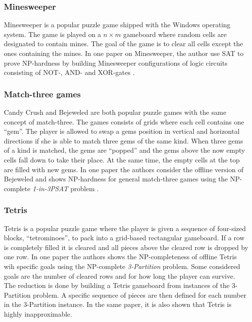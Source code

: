 \subsubsection{Minesweeper}
Minesweeper is a popular puzzle game shipped with the Windows operating system. The game is played on a $n \times m$ gameboard where random cells are designated to contain mines. The goal of the game is to clear all cells except the ones containing the mines. In one paper on Minesweeper, the author use SAT to prove NP-hardness by building Minesweeper configurations of logic circuits consisting of NOT-, AND- and XOR-gates \cite{minesweeper}.

\subsubsection{Match-three games}

Candy Crush and Bejeweled are both popular puzzle games with the same concept of match-three. The games consists of grids where each cell contains one ``gem''. The player is allowed to swap a gems position in vertical and horizontal directions if she is able to match three gems of the same kind. When three gems of a kind is matched, the gems are ``popped'' and the gems above the now empty cells fall down to take their place. At the same time, the empty cells at the top are filled with new gems. In one paper the authors consider the offline version of Bejeweled and shows NP-hardness for general match-three games using the NP-complete \textit{1-in-3PSAT} problem \cite{candy}.

\subsubsection{Tetris}

Tetris is a popular puzzle game where the player is given a sequence of  four-sized blocks, ``tetrominoes'', to pack into a grid-based rectangular gameboard. If a row is completely filled it is cleared and all pieces above the cleared row is dropped by one row. In one paper the authors
shows the NP-completeness of offline Tetris wih specific goals using the NP-complete \textit{3-Partition} problem. Some considered goals are the number of cleared rows and for how long the player can survive. The reduction is done by building a Tetris gameboard from instances of the 3-Partition problem. A specific sequence of pieces are then defined for each number in the 3-Partition instance. In the same paper, it is also shown that Tetris is highly inapproximable. 

